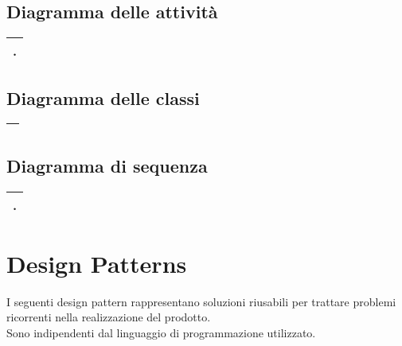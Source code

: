 \documentclass{scrreprt}
\begin{document}
\pagebreak

\section{Diagramma delle attività}
	\FloatBarrier
	\begin{table}[h|]
	\begin{tabular}{|c|}
	\hline
	{ . } \\
	\hline
	\end{tabular}
	\end{table}
	\FloatBarrier


\pagebreak

\section{Diagramma delle classi}
	\FloatBarrier
	\begin{table}[h|]
	\begin{tabular}{|c|}
	\hline
	{ } \\
	\hline
	\end{tabular}
	\end{table}
	\FloatBarrier


\pagebreak

\section{Diagramma di sequenza}
	\FloatBarrier
	\begin{table}[h|]
	\begin{tabular}{|c|}
	\hline
	{ . } \\
	\hline
	\end{tabular}
	\end{table}
	\FloatBarrier


\chapter{Design Patterns}

I seguenti design pattern rappresentano soluzioni riusabili per
trattare problemi ricorrenti nella realizzazione del prodotto.\\
Sono indipendenti dal linguaggio di programmazione utilizzato.
\end{document}
